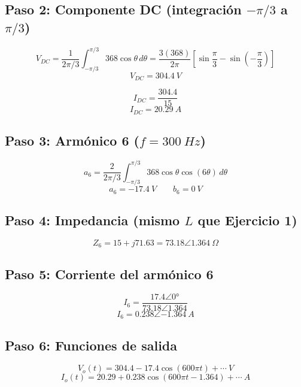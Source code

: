 \documentclass[12pt]{article}
\begin{document}
\subsection*{Paso 2: Componente DC (integración $-\pi/3$ a $\pi/3$)}
\begin{equation}
V_{DC}=\frac{1}{2\pi/3}\int_{-\pi/3}^{\pi/3}368\cos\theta\,d\theta=\frac{3(368)}{2\pi}\left[\sin\frac{\pi}{3}-\sin\left(-\frac{\pi}{3}\right)\right]
\end{equation}
\begin{equation}
\boxed{V_{DC}=304.4\ V}
\end{equation}

\begin{equation}
I_{DC}=\frac{304.4}{15}
\end{equation}
\begin{equation}
\boxed{I_{DC}=20.29\ A}
\end{equation}

\subsection*{Paso 3: Armónico 6 ($f=300\ Hz$)}
\begin{equation}
a_6=\frac{2}{2\pi/3}\int_{-\pi/3}^{\pi/3}368\cos\theta\cos(6\theta)\,d\theta
\end{equation}
\begin{equation}
\boxed{a_6=-17.4\ V} \qquad \boxed{b_6=0\ V}
\end{equation}

\subsection*{Paso 4: Impedancia (mismo $L$ que Ejercicio 1)}
\begin{equation}
\boxed{Z_6=15+j71.63=73.18\angle1.364\ \Omega}
\end{equation}

\subsection*{Paso 5: Corriente del armónico 6}
\begin{equation}
I_6=\frac{17.4\angle0°}{73.18\angle1.364}
\end{equation}
\begin{equation}
\boxed{I_6=0.238\angle{-1.364}\ A}
\end{equation}

\subsection*{Paso 6: Funciones de salida}
\begin{equation}
V_o(t)=304.4-17.4\cos(600\pi t)+\cdots\ V
\end{equation}
\begin{equation}
I_o(t)=20.29+0.238\cos(600\pi t-1.364)+\cdots\ A
\end{equation}
\end{document}
